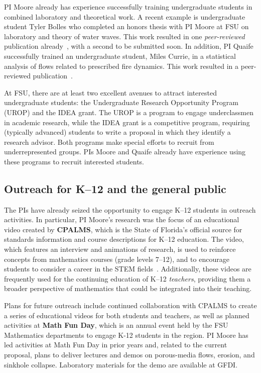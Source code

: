 \documentclass[11pt]{article}
\begin{document}
PI Moore already has experience successfully training undergraduate students in combined laboratory and theoretical work. A recent example is undergraduate student Tyler Bolles who completed an honors thesis with PI Moore at FSU on laboratory and theory of water waves. This work resulted in one {\em peer-reviewed} publication already~\cite{Bolles2019}, with a second to be submitted soon. In addition, PI Quaife successfully trained an undergraduate student, Miles Currie, in a statistical analysis of flows related to prescribed fire dynamics.  This work resulted in a peer-reviewed publication~\cite{cur-spe-hie-obr-goo-qua2018}.

At FSU, there are at least two excellent avenues to attract interested undergraduate students:  the Undergraduate Research Opportunity Program (UROP) and the IDEA grant. The UROP is a program to engage underclassmen in academic research, while the IDEA grant is a competitive program, requiring (typically advanced) students to write a proposal in which they identify a research advisor. Both programs make special efforts to recruit from underrepresented groups. PIs Moore and Quaife already have experience using these programs to recruit interested students.

\subsection{Outreach for K--12 and the general public}
The PIs have already seized the opportunity to engage K--12 students in outreach activities. In particular, PI Moore's research was the focus of an educational video created by {\bf CPALMS}, which is the State of Florida's official source for standards information and course descriptions for K--12 education. The video, which features an interview and animations of research, is used to reinforce concepts from mathematics courses (grade levels 7--12), and to encourage students to consider a career in the STEM fields~\cite{CPALMS}. Additionally, these videos are frequently used for the continuing education of K--12 {\em teachers}, providing them a broader perspective of mathematics that could be integrated into their teaching.
 
Plans for future outreach include continued collaboration with CPALMS to create a series of educational videos for both students and teachers, as well as planned activities at {\bf Math Fun Day}, which is an annual event held by the FSU Mathematics departments to engage K-12 students in the region. PI Moore has led activities at Math Fun Day in prior years and, related to the current proposal, plans to deliver lectures and demos on porous-media flows, erosion, and sinkhole collapse. Laboratory materials for the demo are available at GFDI.
\end{document}
